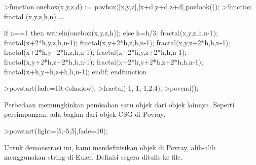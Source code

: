 \documentclass{article}
\begin{document}
\begin{eulernotebook}
\begin{eulercomment}
\begin{eulercomment}
\begin{eulercomment}
\begin{eulercomment}
\begin{eulercomment}
\begin{eulercomment}
\begin{eulercomment}
\begin{eulercomment}
\begin{eulercomment}
\begin{eulercomment}
\begin{eulercomment}
\begin{eulercomment}
\begin{eulercomment}
\begin{eulercomment}
\begin{eulercomment}
\begin{eulercomment}
\begin{eulercomment}
\end{eulercomment}
\begin{eulerprompt}
>function onebox(x,y,z,d) := povbox([x,y,z],[x+d,y+d,z+d],povlook());
>function fractal (x,y,z,h,n) ...
\end{eulerprompt}
\begin{eulerudf}
   if n==1 then writeln(onebox(x,y,z,h));
   else
     h=h/3;
     fractal(x,y,z,h,n-1);
     fractal(x+2*h,y,z,h,n-1);
     fractal(x,y+2*h,z,h,n-1);
     fractal(x,y,z+2*h,h,n-1);
     fractal(x+2*h,y+2*h,z,h,n-1);
     fractal(x+2*h,y,z+2*h,h,n-1);
     fractal(x,y+2*h,z+2*h,h,n-1);
     fractal(x+2*h,y+2*h,z+2*h,h,n-1);
     fractal(x+h,y+h,z+h,h,n-1);
   endif;
  endfunction
\end{eulerudf}
\begin{eulerprompt}
>povstart(fade=10,<shadow);
>fractal(-1,-1,-1,2,4);
>povend();
\end{eulerprompt}
\begin{eulercomment}
Perbedaan memungkinkan pemisahan satu objek dari objek lainnya.
Seperti persimpangan, ada bagian dari objek CSG di Povray.
\end{eulercomment}
\begin{eulerprompt}
>povstart(light=[5,-5,5],fade=10);
\end{eulerprompt}
\begin{eulercomment}
Untuk demonstrasi ini, kami mendefinisikan objek di Povray, alih-alih
menggunakan string di Euler. Definisi segera ditulis ke file.


\end{eulercomment}
\end{eulercomment}
\end{eulercomment}
\end{eulercomment}
\end{eulercomment}
\end{eulercomment}
\end{eulercomment}
\end{eulercomment}
\end{eulercomment}
\end{eulercomment}
\end{eulercomment}
\end{eulercomment}
\end{eulercomment}
\end{eulercomment}
\end{eulercomment}
\end{eulercomment}
\end{eulercomment}
\end{eulernotebook}
\end{document}
